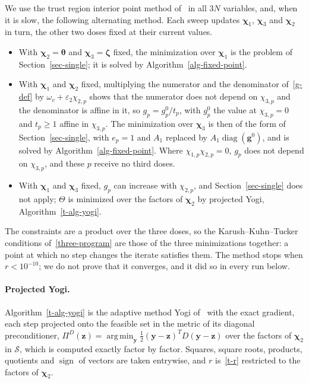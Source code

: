 \documentclass[11pt]{article}
\theoremstyle{plain}
\theoremstyle{definition}
\theoremstyle{remark}
\numberwithin{equation}{section}
\numberwithin{figure}{section}
\numberwithin{table}{section}
\numberwithin{algorithm}{section}
\begin{document}
We use the trust region interior point method
of~\cite{1999Byrd_Hribar_Nocedal} in all $3N$ variables, and, when it is slow,
the following alternating method. Each sweep updates $\bm\chi_1$, $\bm\chi_3$
and $\bm\chi_2$ in turn, the other two doses fixed at their current values.
\begin{itemize}
\item With $\bm\chi_2=\bm\theta$ and $\bm\chi_3=\bm\zeta$ fixed, the
minimization over $\bm\chi_1$ is the problem of Section~\ref{sec-single}; it
is solved by Algorithm~\ref{alg-fixed-point}.
\item With $\bm\chi_1$ and $\bm\chi_2$ fixed, multiplying the numerator and the
denominator of~\eqref{g-def} by $\omega_v+\varepsilon_2\chi_{2,p}$ shows that
the numerator does not depend on $\chi_{3,p}$ and the denominator is affine in
it, so $g_p=g^0_p/t_p$, with $g^0_p$ the value at $\chi_{3,p}=0$ and $t_p\ge 1$
affine in $\chi_{3,p}$. The minimization over $\bm\chi_3$ is then of the form
of Section~\ref{sec-single}, with $e_p=1$ and $A_1$ replaced by
$A_1\operatorname{diag}\left(\bm g^0\right)$, and is solved by
Algorithm~\ref{alg-fixed-point}. Where $\chi_{1,p}\chi_{2,p}=0$, $g_p$ does not
depend on $\chi_{3,p}$, and these $p$ receive no third doses.
\item With $\bm\chi_1$ and $\bm\chi_3$ fixed, $g_p$ can increase with
$\chi_{2,p}$, and Section~\ref{sec-single} does not apply; $\Theta$ is
minimized over the factors of $\bm\chi_2$ by projected Yogi,
Algorithm~\ref{t-alg-yogi}.
\end{itemize}
The constraints are a product over the three doses, so the
Karush--Kuhn--Tucker conditions of~\eqref{three-program} are those of the
three minimizations together: a point at which no step changes the iterate
satisfies them. The method stops when $r<10^{-10}$; we do not prove that it
converges, and it did so in every run below.

\paragraph{Projected Yogi.}
Algorithm~\ref{t-alg-yogi} is the adaptive method Yogi
of~\cite{2018Zaheer_Yogi} with the exact gradient, each step projected onto the
feasible set in the metric of its diagonal preconditioner,
$\Pi^D(\bm z)=\operatorname*{arg\,min}_{\bm y}\frac12(\bm y-\bm z)^TD(\bm y-\bm z)$
over the factors of $\bm\chi_2$ in $\mathcal{S}$, which is computed exactly
factor by factor. Squares, square roots, products, quotients and
$\operatorname{sign}$ of vectors are taken entrywise, and $r$ is~\eqref{t-r}
restricted to the factors of $\bm\chi_2$.
\end{document}

